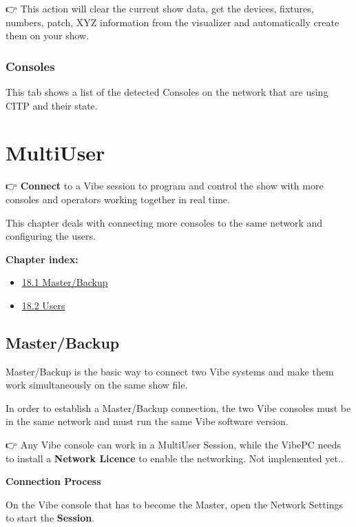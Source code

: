 \documentclass[
]{article}
\providecommand{\tightlist}{%
  \setlength{\itemsep}{0pt}\setlength{\parskip}{0pt}}
\begin{document}
👉 This action will clear the current show data, get the devices, fixtures, numbers, patch, XYZ information from the visualizer and automatically create them on your show.

\hypertarget{consoles}{%
\subsubsection{Consoles}\label{consoles}}

This tab shows a list of the detected Consoles on the network that are using CITP and their state.

\hypertarget{multiuser}{%
\section{MultiUser}\label{multiuser}}

👉 \textbf{Connect} to a Vibe session to program and control the show with more consoles and operators working together in real time.

This chapter deals with connecting more consoles to the same network and configuring the users.

\textbf{Chapter index:}

\begin{itemize}
\tightlist
\item
  \protect\hyperlink{Masterux2fBackup-18.1}{18.1 Master/Backup}
\item
  \protect\hyperlink{Multi-User-18.2}{18.2 Users}
\end{itemize}

\hypertarget{masterbackup}{%
\subsection{Master/Backup}\label{masterbackup}}

Master/Backup is the basic way to connect two Vibe systems and make them work simultaneously on the same show file.

In order to establish a Master/Backup connection, the two Vibe consoles must be in the same network and must run the same Vibe software version.

👉 { Any Vibe console can work in a MultiUser Session, while the VibePC needs to install a \textbf{Network Licence} to enable the networking. Not implemented yet.}.

\textbf{Connection Process}

On the Vibe console that has to become the Master, open the Network Settings to start the \textbf{Session}.
\end{document}
